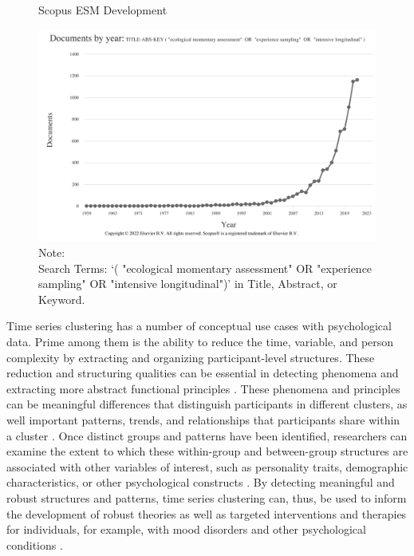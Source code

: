 \documentclass[man, 12pt, a4paper, mask, floatsintext]{apa7}
\theoremstyle{break}
\theoremstyle{plain}
\begin{document}
\begin{figure}[!hbtp] %
  \caption{Scopus ESM Development}
  \label{fig:ScopusEsm}
  \centering\includegraphics[width=\textwidth]{figures/Scopus-ESM-Development.png}
  \caption*{Note: \\
  Search Terms: `( "ecological momentary assessment"  OR  "experience sampling"  OR  "intensive longitudinal")' in Title, Abstract, or Keyword.}
\end{figure}

Time series clustering has a number of conceptual use cases with psychological data. Prime among them is the ability to reduce the time, variable, and person complexity by extracting and organizing participant-level structures. These reduction and structuring qualities can be essential in detecting phenomena and extracting more abstract functional principles \citep[][]{eronen2021a}. These phenomena and principles can be meaningful differences that distinguish participants in different clusters, as well important patterns, trends, and relationships that participants share within a cluster \citep[e.g.,][]{schrodt2000}. Once distinct groups and patterns have been identified, researchers can examine the extent to which these within-group and between-group structures are associated with other variables of interest, such as personality traits, demographic characteristics, or other psychological constructs \citep[e.g.,][]{monden2022}. By detecting meaningful and robust structures and patterns, time series clustering can, thus, be used to inform the development of robust theories as well as targeted interventions and therapies for individuals, for example, with mood disorders and other psychological conditions \citep[e.g.,][]{borsboom2021, eronen2020}.
\end{document}
